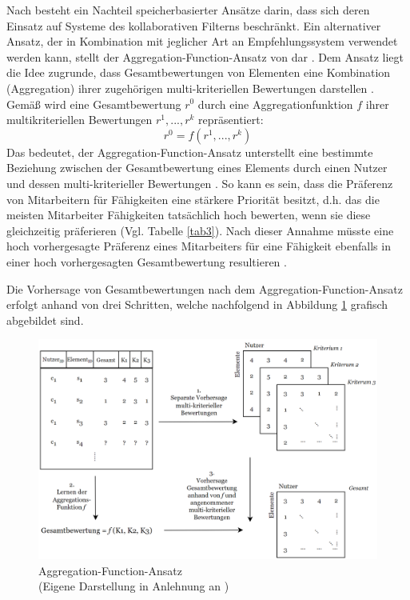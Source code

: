 Nach \textcite[S. 861]{adomavicius:4:inbook} besteht ein Nachteil speicherbasierter Ansätze darin, dass sich deren Einsatz auf Systeme des kollaborativen Filterns beschränkt.
Ein alternativer Ansatz, der in Kombination mit jeglicher Art an Empfehlungssystem verwendet werden kann, stellt der Aggregation-Function-Ansatz von \textcite[S. 52ff.]{adomavicius:inproceedings:2} dar \cite[S. 861]{adomavicius:4:inbook}.
Dem Ansatz liegt die Idee zugrunde, dass Gesamtbewertungen von Elementen eine Kombination (Aggregation) ihrer zugehörigen multi-kriteriellen Bewertungen darstellen \cite[S. 861]{adomavicius:4:inbook}.
Gemäß \textcite[S. 52]{adomavicius:inproceedings:2} wird eine Gesamtbewertung $r^{0}$ durch eine Aggregationfunktion $f$ ihrer multikriteriellen Bewertungen $r^{1}, ..., r^{k}$ repräsentiert:
\begin{equation}\label{eq22}
    r^{0} = f(r^{1}, ..., r^{k})
\end{equation}
Das bedeutet, der Aggregation-Function-Ansatz unterstellt eine bestimmte Beziehung zwischen der Gesamtbewertung eines Elements durch einen Nutzer und dessen multi-kriterieller Bewertungen \cite[S. 52]{adomavicius:inproceedings:2}.
So kann es sein, dass die Präferenz von Mitarbeitern für Fähigkeiten eine stärkere Priorität besitzt, d.h. das die meisten Mitarbeiter Fähigkeiten tatsächlich hoch bewerten, wenn sie diese gleichzeitig präferieren (Vgl. Tabelle \ref{tab3}).
Nach dieser Annahme müsste eine hoch vorhergesagte Präferenz eines Mitarbeiters für eine Fähigkeit ebenfalls in einer hoch vorhergesagten Gesamtbewertung resultieren \cite[S. 52]{adomavicius:inproceedings:2}.

Die Vorhersage von Gesamtbewertungen nach dem Aggregation-Function-Ansatz erfolgt anhand von drei Schritten, welche nachfolgend in Abbildung \ref{fig:optimierung:loesungen:abb1} grafisch abgebildet sind.

\begin{figure}
    \centering
	\includegraphics[width=1.0\textwidth]{gfx/a-f-ansatz.png}
	\caption[Aggregation-Function-Ansatz]{Aggregation-Function-Ansatz\\
    (Eigene Darstellung in Anlehnung an \cite[S. 862]{adomavicius:4:inbook})}
	\label{fig:optimierung:loesungen:abb1}
\end{figure}

